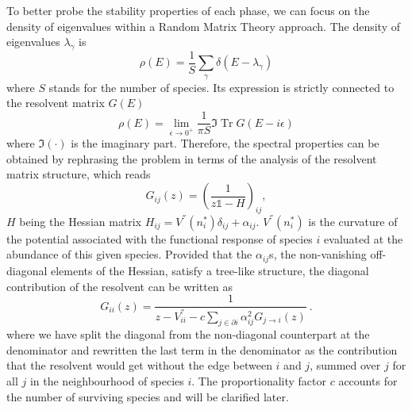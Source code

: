 \documentclass[12pt]{article}
\begin{document}
To better probe the stability properties of each phase, we can focus on the density of eigenvalues within a Random Matrix Theory approach. 
The density of eigenvalues $\lambda_\gamma$ is
\begin{equation}
\rho(E)= \frac{1}{S} \sum_{\gamma}\delta(E-\lambda_{\gamma})
\end{equation}
where $S$ stands for the number of species.
Its expression is strictly connected to the resolvent matrix $G(E)$ 
\begin{equation}
\rho(E)= \lim_{\epsilon \rightarrow 0^{+}} \frac{1}{\pi S} \Im \; {\text{Tr} \; G(E-i \epsilon)}
\label{density_E}
\end{equation}
where $\Im( \cdot )$ is the imaginary part. Therefore, the spectral properties can be obtained by rephrasing the problem in terms of the analysis of the resolvent matrix structure, which reads
\begin{equation}
G_{ij}(z)= \left (\frac{1}{z \mathbb{1}-H} \right)_{ij} ,
\end{equation}
$H$ being the Hessian matrix $H_{ij}=V^{''}(n^{*}_i)\delta_{ij}+\alpha_{ij}$. $V^{''}(n^{*}_i)$ is the curvature of the potential associated with the functional response of species $i$ evaluated at the abundance of this given species. 
Provided that the $\alpha_{ij}$s, the non-vanishing off-diagonal elements of the Hessian, satisfy a tree-like structure, the diagonal contribution of the resolvent can be written as
\begin{equation}
G_{ii}(z)=\frac{1}{z-V_{ii}^{''}-c \sum_{j \in \partial i}  \alpha_{ij}^2 G_{j \rightarrow i}(z)} \ .
\label{resolvent_diag}
\end{equation}
where we have split the diagonal from the non-diagonal counterpart at the denominator and rewritten the last term in the denominator as the contribution that the resolvent would get without the edge between $i$ and $j$, summed over $j$ for all $j$ in the neighbourhood of species $i$. The proportionality factor $c$ accounts for the number of surviving species and will be clarified later.
\end{document}
